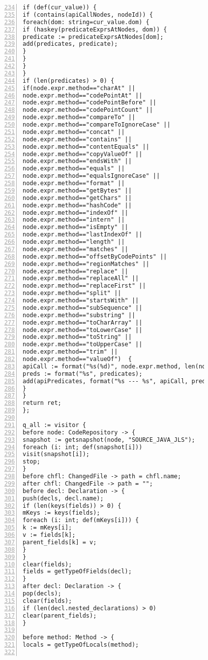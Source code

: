 \begin{figure}[ht!]
\begin{lstlisting}[numbers=left, tabsize=4, escapechar=@, caption={API Precondition Mining Analysis},label={lst:apm-code}, firstline = 234, firstnumber = 234, lastline = 295]
if (def(cur_value)) {
if (contains(apiCallNodes, nodeId)) {
foreach(dom: string=cur_value.dom) {
if (haskey(predicateExprsAtNodes, dom)) {
predicate := predicateExprsAtNodes[dom];
add(predicates, predicate);
}
}
}
}
if (len(predicates) > 0) {
if(node.expr.method=="charAt" ||  
node.expr.method=="codePointAt" || 
node.expr.method=="codePointBefore" || 
node.expr.method=="codePointCount" || 
node.expr.method=="compareTo" || 
node.expr.method=="compareToIgnoreCase" || 
node.expr.method=="concat" || 
node.expr.method=="contains" || 
node.expr.method=="contentEquals" || 
node.expr.method=="copyValueOf" || 
node.expr.method=="endsWith" || 
node.expr.method=="equals" || 
node.expr.method=="equalsIgnoreCase" || 
node.expr.method=="format" || 
node.expr.method=="getBytes" || 
node.expr.method=="getChars" || 
node.expr.method=="hashCode" || 
node.expr.method=="indexOf" || 
node.expr.method=="intern" || 
node.expr.method=="isEmpty" || 
node.expr.method=="lastIndexOf" || 
node.expr.method=="length" || 
node.expr.method=="matches" || 
node.expr.method=="offsetByCodePoints" || 
node.expr.method=="regionMatches" || 
node.expr.method=="replace" || 
node.expr.method=="replaceAll" || 
node.expr.method=="replaceFirst" || 
node.expr.method=="split" ||  
node.expr.method=="startsWith" ||  
node.expr.method=="subSequence" || 
node.expr.method=="substring" || 
node.expr.method=="toCharArray" || 
node.expr.method=="toLowerCase" || 
node.expr.method=="toString" || 
node.expr.method=="toUpperCase" || 
node.expr.method=="trim" || 
node.expr.method=="valueOf")  {
apiCall := format("%s(%d)", node.expr.method, len(node.expr.method_args));
preds := format("%s", predicates);
add(apiPredicates, format("%s --- %s", apiCall, preds));
}
}
return ret;
};

q_all := visitor {
before node: CodeRepository -> {
snapshot := getsnapshot(node, "SOURCE_JAVA_JLS");
foreach (i: int; def(snapshot[i]))
visit(snapshot[i]);
stop;
}
before chfl: ChangedFile -> path = chfl.name;
after chfl: ChangedFile -> path = "";
before decl: Declaration -> {
push(decls, decl.name);
if (len(keys(fields)) > 0) {
mKeys := keys(fields);    
foreach (i: int; def(mKeys[i])) {
k := mKeys[i];
v := fields[k];
parent_fields[k] = v;
}
}
clear(fields);
fields = getTypeOfFields(decl);
}
after decl: Declaration -> {
pop(decls);
clear(fields);
if (len(decl.nested_declarations) > 0)
clear(parent_fields);
}

before method: Method -> {
locals = getTypeOfLocals(method);


\end{lstlisting}
\end{figure}
